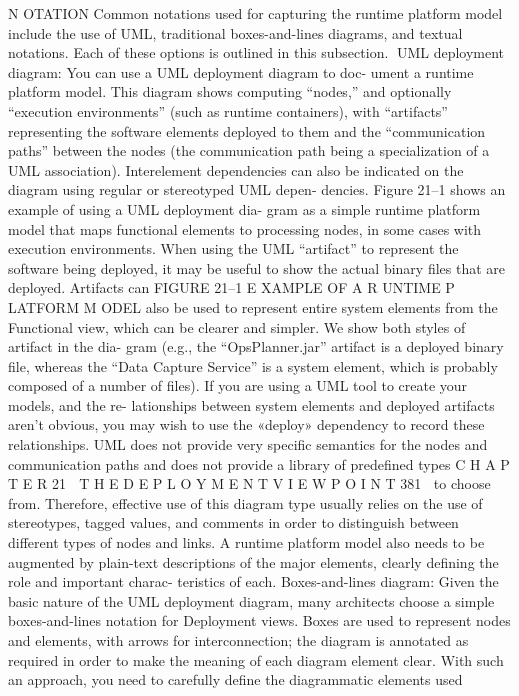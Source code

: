 N OTATION Common notations used for capturing the runtime platform model
include the use of UML, traditional boxes-and-lines diagrams, and textual
notations. Each of these options is outlined in this subsection.
UML deployment diagram: You can use a UML deployment diagram to doc-
ument a runtime platform model. This diagram shows computing “nodes,”
and optionally “execution environments” (such as runtime containers),
with “artifacts” representing the software elements deployed to them and
the “communication paths” between the nodes (the communication path
being a specialization of a UML association). Interelement dependencies can
also be indicated on the diagram using regular or stereotyped UML depen-
dencies. Figure 21–1 shows an example of using a UML deployment dia-
gram as a simple runtime platform model that maps functional elements to
processing nodes, in some cases with execution environments.
When using the UML “artifact” to represent the software being deployed, it
may be useful to show the actual binary files that are deployed. Artifacts can
FIGURE 21–1 E XAMPLE OF A R UNTIME P LATFORM M ODEL
also be used to represent entire system elements from the Functional view,
which can be clearer and simpler. We show both styles of artifact in the dia-
gram (e.g., the “OpsPlanner.jar” artifact is a deployed binary file, whereas the
“Data Capture Service” is a system element, which is probably composed of a
number of files). If you are using a UML tool to create your models, and the re-
lationships between system elements and deployed artifacts aren’t obvious,
you may wish to use the «deploy» dependency to record these relationships.
UML does not provide very specific semantics for the nodes and
communication paths and does not provide a library of predefined types
C H A P T E R 21  T H E D E P L O Y M E N T V I E W P O I N T
 381
to choose from. Therefore, effective use of this diagram type usually
relies on the use of stereotypes, tagged values, and comments in order
to distinguish between different types of nodes and links. A runtime
platform model also needs to be augmented by plain-text descriptions
of the major elements, clearly defining the role and important charac-
teristics of each.
Boxes-and-lines diagram: Given the basic nature of the UML deployment
diagram, many architects choose a simple boxes-and-lines notation for
Deployment views. Boxes are used to represent nodes and elements, with
arrows for interconnection; the diagram is annotated as required in
order to make the meaning of each diagram element clear. With such an
approach, you need to carefully define the diagrammatic elements used
